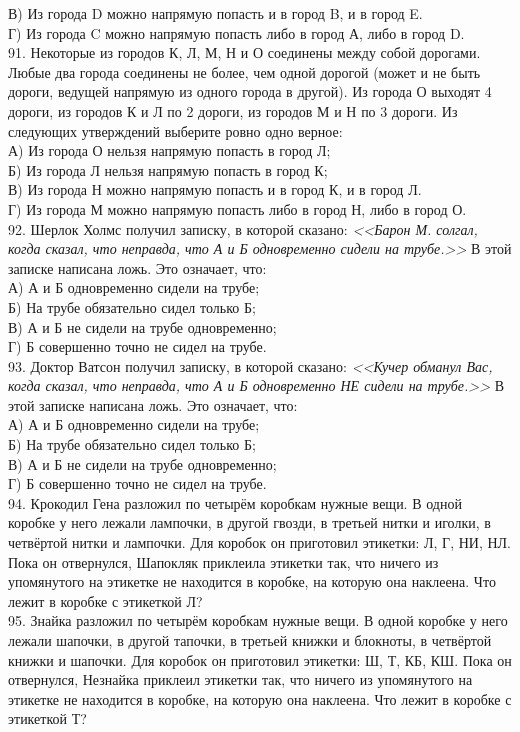 В) Из города D можно напрямую попасть и в город B, и в город E.\\
Г) Из города C можно напрямую попасть либо в город А, либо в город D.\\
91. Некоторые из городов К, Л, М, Н и О соединены между собой дорогами. Любые два города соединены не более, чем одной дорогой (может и не быть дороги, ведущей напрямую из одного города в другой). Из города О выходят 4 дороги, из городов К и Л по 2 дороги, из городов М и Н по 3 дороги. Из следующих утверждений выберите ровно одно верное:\\
А) Из города О нельзя напрямую попасть в город Л;\\
Б) Из города Л нельзя напрямую попасть в город К;\\
В) Из города Н можно напрямую попасть и в город К, и в город Л.\\
Г) Из города М можно напрямую попасть либо в город Н, либо в город О.\\
92. Шерлок Холмс получил записку, в которой сказано: {\it <<Барон М. солгал, когда сказал, что неправда, что А и Б одновременно сидели на трубе.>>} В этой записке написана ложь. Это означает, что:\\
А) А и Б одновременно сидели на трубе;\\
Б) На трубе обязательно сидел только Б;\\
В) А и Б не сидели на трубе одновременно;\\
Г) Б совершенно точно не сидел на трубе.\\
93. Доктор Ватсон получил записку, в которой сказано: {\it <<Кучер обманул Вас, когда сказал, что неправда, что А и Б одновременно НЕ сидели на трубе.>>} В этой записке написана ложь. Это означает, что:\\
А) А и Б одновременно сидели на трубе;\\
Б) На трубе обязательно сидел только Б;\\
В) А и Б не сидели на трубе одновременно;\\
Г) Б совершенно точно не сидел на трубе.\\
94. Крокодил Гена разложил по четырём коробкам нужные вещи. В одной коробке у него лежали лампочки, в другой гвозди, в третьей нитки и иголки, в четвёртой нитки и лампочки. Для коробок он приготовил этикетки: Л, Г, НИ, НЛ. Пока он отвернулся, Шапокляк приклеила этикетки так, что ничего из упомянутого на этикетке не находится в коробке, на которую она наклеена. Что лежит в коробке с этикеткой Л?\\
95. Знайка разложил по четырём коробкам нужные вещи. В одной коробке у него лежали шапочки, в другой тапочки, в третьей книжки и блокноты, в четвёртой книжки и шапочки. Для коробок он приготовил этикетки: Ш, Т, КБ, КШ. Пока он отвернулся, Незнайка приклеил этикетки так, что ничего из упомянутого на этикетке не находится в коробке, на которую она наклеена. Что лежит в коробке с этикеткой Т?\\
